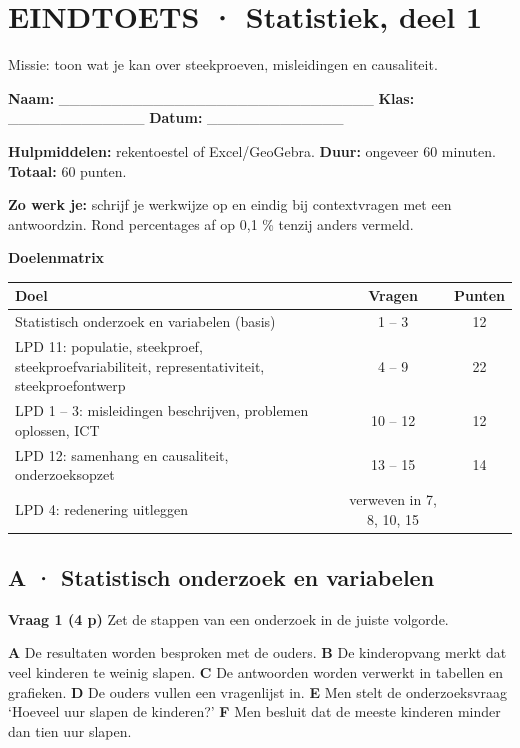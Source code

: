 \section{EINDTOETS · Statistiek, deel 1}

\begin{missie}
Missie: toon wat je kan over steekproeven, misleidingen en causaliteit.
\end{missie}

\textbf{Naam:} \_\_\_\_\_\_\_\_\_\_\_\_\_\_\_\_\_\_\_\_\_\_\_\_\_\_\_\_\_\_ \quad \textbf{Klas:} \_\_\_\_\_\_\_\_\_\_\_\_\_ \quad \textbf{Datum:} \_\_\_\_\_\_\_\_\_\_\_\_\_

\textbf{Hulpmiddelen:} rekentoestel of Excel/GeoGebra. \quad \textbf{Duur:} ongeveer 60 minuten. \quad \textbf{Totaal:} 60 punten.

\begin{letop}
\textbf{Zo werk je:} schrijf je werkwijze op en eindig bij contextvragen met een antwoordzin. Rond percentages af op 0,1 \% tenzij anders vermeld.
\end{letop}

\textbf{Doelenmatrix}

\begin{tabular}{lcc}
\hline
Doel & Vragen & Punten \\
\hline
Statistisch onderzoek en variabelen (basis) & 1 – 3 & 12 \\
LPD 11: populatie, steekproef, steekproefvariabiliteit, representativiteit, steekproefontwerp & 4 – 9 & 22 \\
LPD 1 – 3: misleidingen beschrijven, problemen oplossen, ICT & 10 – 12 & 12 \\
LPD 12: samenhang en causaliteit, onderzoeksopzet & 13 – 15 & 14 \\
LPD 4: redenering uitleggen & verweven in 7, 8, 10, 15 & \\
\hline
\end{tabular}

\subsection*{A · Statistisch onderzoek en variabelen}

\textbf{Vraag 1 \quad (4 p)} Zet de stappen van een onderzoek in de juiste volgorde.

\textbf{A} De resultaten worden besproken met de ouders. \quad \textbf{B} De kinderopvang merkt dat veel kinderen te weinig slapen. \quad \textbf{C} De antwoorden worden verwerkt in tabellen en grafieken. \quad \textbf{D} De ouders vullen een vragenlijst in. \quad \textbf{E} Men stelt de onderzoeksvraag ‘Hoeveel uur slapen de kinderen?’ \quad \textbf{F} Men besluit dat de meeste kinderen minder dan tien uur slapen.

